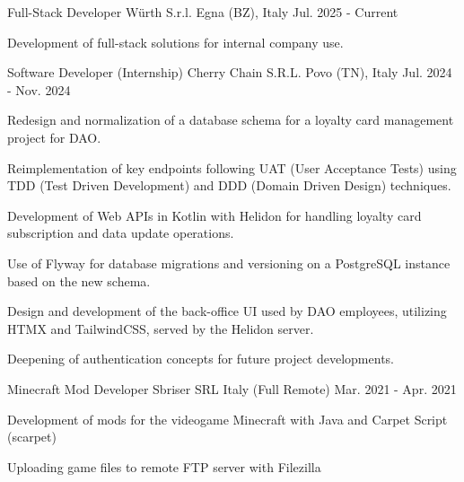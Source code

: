 

\begin{cventries}
\cventry
    {Full-Stack Developer} %
    {Würth S.r.l.} %
    {Egna (BZ), Italy} %
    {Jul. 2025 - Current} %
    {
      \begin{cvitems} %
        \item {Development of full-stack solutions for internal company use.}
      \end{cvitems}
    }

\cventry
    {Software Developer} %
    {(Internship) Cherry Chain S.R.L.} %
    {Povo (TN), Italy} %
    {Jul. 2024 - Nov. 2024} %
    {
      \begin{cvitems} %
        \item {Redesign and normalization of a database schema for a loyalty card management project for DAO.}
        \item {Reimplementation of key endpoints following UAT (User Acceptance Tests) using TDD (Test Driven Development) and DDD (Domain Driven Design) techniques.}
        \item {Development of Web APIs in Kotlin with Helidon for handling loyalty card subscription and data update operations.}
        \item {Use of Flyway for database migrations and versioning on a PostgreSQL instance based on the new schema.}
        \item {Design and development of the back-office UI used by DAO employees, utilizing HTMX and TailwindCSS, served by the Helidon server.}
        \item {Deepening of authentication concepts for future project developments.}
      \end{cvitems}
    }


  \cventry
    {Minecraft Mod Developer} %
    {Sbriser SRL}%
    {Italy (Full Remote)} %
    {Mar. 2021 - Apr. 2021} %
    {
      \begin{cvitems} %
        \item {Development of mods for the videogame Minecraft with Java and Carpet Script (scarpet)}
        \item {Uploading game files to remote FTP server with Filezilla}
      \end{cvitems}
    }


\end{cventries}

